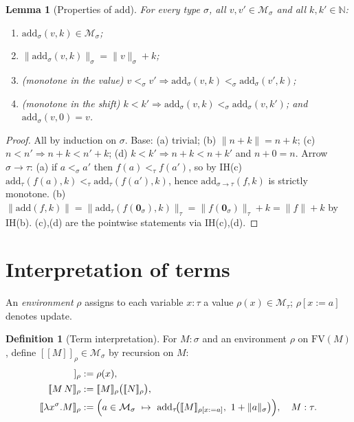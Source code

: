 \documentclass{amsart}
\newtheorem{lemma}{Lemma}
\theoremstyle{definition}
\newtheorem{definition}{Definition}
\newcommand{\interp}[1]{[\![#1]\!]}
\newcommand{\FV}{\mathrm{FV}}
\begin{document}
\begin{lemma}[Properties of $\mathrm{add}$]\label{lem:add}
For every type $\sigma$, all $v,v'\in\mathcal M_\sigma$ and all $k,k'\in\mathbb N$:
\begin{enumerate}
\item[(a)] $\mathrm{add}_\sigma(v,k)\in\mathcal M_\sigma$;
\item[(b)] $\|\mathrm{add}_\sigma(v,k)\|_\sigma=\|v\|_\sigma+k$;
\item[(c)] \emph{(monotone in the value)} $v<_\sigma v'\Rightarrow\mathrm{add}_\sigma(v,k)<_\sigma\mathrm{add}_\sigma(v',k)$;
\item[(d)] \emph{(monotone in the shift)} $k<k'\Rightarrow\mathrm{add}_\sigma(v,k)<_\sigma\mathrm{add}_\sigma(v,k')$; and $\mathrm{add}_\sigma(v,0)=v$.
\end{enumerate}
\end{lemma}

\begin{proof}
All by induction on $\sigma$. Base: (a) trivial; (b) $\|n+k\|=n+k$; (c) $n<n'\Rightarrow n+k<n'+k$;
(d) $k<k'\Rightarrow n+k<n+k'$ and $n+0=n$. Arrow $\sigma\to\tau$: (a) if $a<_\sigma a'$ then
$f(a)<_\tau f(a')$, so by IH(c) $\mathrm{add}_\tau(f(a),k)<_\tau\mathrm{add}_\tau(f(a'),k)$, hence
$\mathrm{add}_{\sigma\to\tau}(f,k)$ is strictly monotone. (b)
$\|\mathrm{add}(f,k)\|=\|\mathrm{add}_\tau(f(\mathbf 0_\sigma),k)\|_\tau=\|f(\mathbf 0_\sigma)\|_\tau+k=\|f\|+k$
by IH(b). (c),(d) are the pointwise statements via IH(c),(d).
\end{proof}

\section{Interpretation of terms}

An \emph{environment} $\rho$ assigns to each variable $x:\tau$ a value
$\rho(x)\in\mathcal M_\tau$; $\rho[x:=a]$ denotes update.

\begin{definition}[Term interpretation]\label{def:interp}
For $M:\sigma$ and an environment $\rho$ on $\FV(M)$, define $\interp{M}_\rho\in\mathcal M_\sigma$
by recursion on $M$:
\begin{align*}
  \interp{x}_\rho &:= \rho(x),\\
  \interp{M\,N}_\rho &:= \interp{M}_\rho\bigl(\interp{N}_\rho\bigr),\\
  \interp{\lambda x^\sigma.M}_\rho &:=
     \Bigl(a\in\mathcal M_\sigma\ \mapsto\
       \mathrm{add}_\tau\!\bigl(\interp{M}_{\rho[x:=a]},\ 1+\|a\|_\sigma\bigr)\Bigr),
     \quad M:\tau .
\end{align*}
\end{definition}
\end{document}
